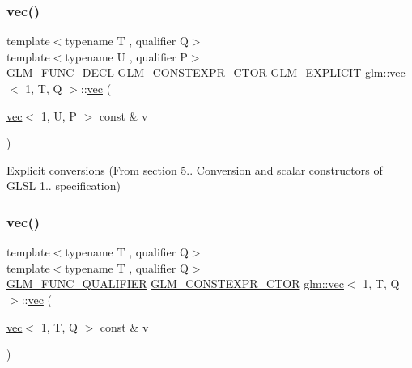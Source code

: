 \subsubsection{\texorpdfstring{vec()}{vec()}\hspace{0.1cm}{\footnotesize\ttfamily [8/14]}}
{\footnotesize\ttfamily template$<$typename T , qualifier Q$>$ \\
template$<$typename U , qualifier P$>$ \\
\mbox{\hyperlink{setup_8hpp_ab2d052de21a70539923e9bcbf6e83a51}{G\+L\+M\+\_\+\+F\+U\+N\+C\+\_\+\+D\+E\+CL}} \mbox{\hyperlink{setup_8hpp_ad34178a09666081abdb573c14d1f4a5a}{G\+L\+M\+\_\+\+C\+O\+N\+S\+T\+E\+X\+P\+R\+\_\+\+C\+T\+OR}} \mbox{\hyperlink{setup_8hpp_a6c74f5a5e7b134ab69023ff9a30d4d5d}{G\+L\+M\+\_\+\+E\+X\+P\+L\+I\+C\+IT}} \mbox{\hyperlink{structglm_1_1vec}{glm\+::vec}}$<$ 1, T, Q $>$\+::\mbox{\hyperlink{structglm_1_1vec}{vec}} (\begin{DoxyParamCaption}\item[{\mbox{\hyperlink{structglm_1_1vec}{vec}}$<$ 1, U, P $>$ const \&}]{v }\end{DoxyParamCaption})}



Explicit conversions (From section 5.. Conversion and scalar constructors of G\+L\+SL 1.. specification) 

\mbox{\label{structglm_1_1vec_3_011_00_01_t_00_01_q_01_4_acf2830b0c38c9707dcda85083f1c93ba}} 
\subsubsection{\texorpdfstring{vec()}{vec()}\hspace{0.1cm}{\footnotesize\ttfamily [9/14]}}
{\footnotesize\ttfamily template$<$typename T , qualifier Q$>$ \\
template$<$typename T , qualifier Q$>$ \\
\mbox{\hyperlink{setup_8hpp_a33fdea6f91c5f834105f7415e2a64407}{G\+L\+M\+\_\+\+F\+U\+N\+C\+\_\+\+Q\+U\+A\+L\+I\+F\+I\+ER}} \mbox{\hyperlink{setup_8hpp_ad34178a09666081abdb573c14d1f4a5a}{G\+L\+M\+\_\+\+C\+O\+N\+S\+T\+E\+X\+P\+R\+\_\+\+C\+T\+OR}} \mbox{\hyperlink{structglm_1_1vec}{glm\+::vec}}$<$ 1, T, Q $>$\+::\mbox{\hyperlink{structglm_1_1vec}{vec}} (\begin{DoxyParamCaption}\item[{\mbox{\hyperlink{structglm_1_1vec}{vec}}$<$ 1, T, Q $>$ const \&}]{v }\end{DoxyParamCaption})}



